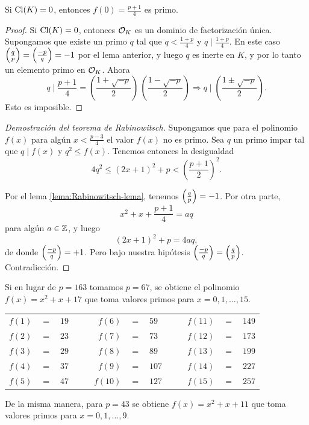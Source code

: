 \begin{lema}
  Si $\operatorname{Cl} (K) = 0$, entonces $f (0) = \frac{p+1}{4}$ es primo.

  \begin{proof}
    Si $\operatorname{Cl} (K) = 0$, entonces $\mathcal{O}_K$ es un dominio de factorización única.
    Supongamos que existe un primo $q$ tal que
    $q < \frac{1+p}{4}$ y $q \mid \frac{1+p}{4}$. En este caso
    $\left(\frac{q}{p}\right) = \left(\frac{-p}{q}\right) = -1$ por el lema anterior, y luego $q$
    es inerte en $K$, y por lo tanto un elemento primo en $\mathcal{O}_K$. Ahora
    \[ q \mid \frac{p+1}{4} =
       \left(\frac{1 + \sqrt{-p}}{2}\right)\,\left(\frac{1 - \sqrt{-p}}{2}\right)
       \Longrightarrow
       q \mid \left(\frac{1 \pm \sqrt{-p}}{2}\right). \]
    Esto es imposible.
  \end{proof}
\end{lema}

\begin{proof}[Demostración del teorema de Rabinowitsch]
  Supongamos que para el polinomio $f (x)$ para algún $x < \frac{p-3}{4}$
  el valor $f (x)$ no es primo. Sea $q$ un primo impar tal que $q \mid f (x)$
  y $q^2 \le f (x)$. Tenemos entonces la desigualdad
  $$4q^2 \le (2x + 1)^2 + p < \left(\frac{p+1}{2}\right)^2.$$

  Por el lema \ref{lema:Rabinowitsch-lema}, tenemos $\left(\frac{q}{p}\right) = -1$.
  Por otra parte,
  $$x^2 + x + \frac{p+1}{4} = aq$$
  para algún $a \in \mathbb{Z}$, y luego
  $$(2x + 1)^2 + p = 4aq,$$
  de donde $\left(\frac{-p}{q}\right) = +1$. Pero bajo nuestra hipótesis
  $\left(\frac{-p}{q}\right) = \left(\frac{q}{p}\right)$. Contradicción.
\end{proof}

\begin{ejemplo}
  Si en lugar de $p = 163$ tomamos $p = 67$, se obtiene el polinomio
  $f (x) = x^2 + x + 17$ que toma valores primos para
  $x = 0,1,\ldots,15$.

  \begin{center}\renewcommand{\arraystretch}{1.5}
    \begin{tabular}{rclc|crclc|crcl}
      $f (1)$  & $=$ & $19$  & & & $f (6)$ & $=$ & $59$ & & & $f (11)$ & $=$ & $149$ \\
      $f (2)$  & $=$ & $23$  & & & $f (7)$ & $=$ & $73$ & & & $f (12)$ & $=$ & $173$ \\
      $f (3)$  & $=$ & $29$  & & & $f (8)$ & $=$ & $89$ & & & $f (13)$ & $=$ & $199$ \\
      $f (4)$  & $=$ & $37$  & & & $f (9)$ & $=$ & $107$ & & & $f (14)$ & $=$ & $227$ \\
      $f (5)$  & $=$ & $47$  & & & $f (10)$ & $=$ & $127$ & & & $f (15)$ & $=$ & $257$
    \end{tabular}
  \end{center}

  De la misma manera, para $p = 43$ se obtiene $f (x) = x^2 + x + 11$ que toma
  valores primos para $x = 0,1,\ldots,9$.
\end{ejemplo}


